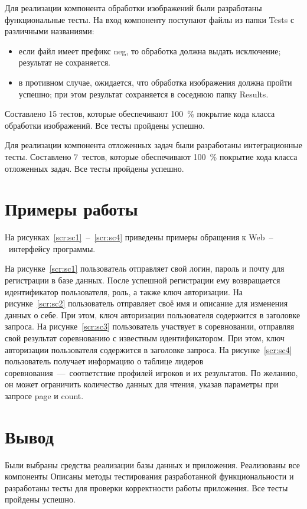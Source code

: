 Для реализации компонента обработки изображений были разработаны функциональные тесты. На вход компоненту поступают файлы из папки Tests с различными названиями:
\begin{itemize}
	\item если файл имеет префикс neg, то обработка должна выдать исключение; результат не сохраняется.
	\item в противном случае, ожидается, что обработка изображения должна пройти успешно; при этом результат сохраняется в соседнюю папку Results.
\end{itemize}
Составлено 15 тестов, которые обеспечивают 100~\% покрытие кода класса обработки изображений. Все тесты пройдены успешно.

Для реализации компонента отложенных задач были разработаны интеграционные тесты. Составлено 7~тестов, которые обеспечивают 100~\% покрытие кода класса отложенных задач. Все тесты пройдены успешно.


\section{Примеры работы}
На рисунках~\ref{scr:sc1}~--~\ref{scr:sc4} приведены примеры обращения к Web~--~интерфейсу программы.

На рисунке~\ref{scr:sc1} пользователь отправляет свой логин, пароль и почту для регистрации в базе данных. После успешной регистрации ему возвращается идентификатор пользователя, роль, а также ключ авторизации. 
\FloatBarrier
На рисунке~\ref{scr:sc2} пользователь отправляет своё имя и описание для изменения данных о себе. При этом, ключ авторизации пользователя содержится в заголовке запроса.
\FloatBarrier
На рисунке~\ref{scr:sc3} пользователь участвует в соревновании, отправляя свой результат соревнованию с известным идентификатором. При этом, ключ авторизации пользователя содержится в заголовке запроса.
\FloatBarrier
На рисунке~\ref{scr:sc4} пользователь получает информацию о таблице лидеров соревнования~---~соответствие профилей игроков и их результатов. По желанию, он может ограничить количество данных для чтения, указав параметры при запросе page и count.
\FloatBarrier

\section*{Вывод}

Были выбраны средства реализации базы данных и приложения. Реализованы все компоненты Описаны методы тестирования разработанной функциональности и разработаны тесты для проверки корректности работы приложения. Все тесты пройдены успешно.

\clearpage
